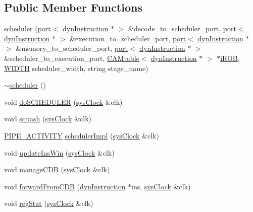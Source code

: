 \subsection*{Public Member Functions}
\begin{DoxyCompactItemize}
\item 
\hyperlink{classscheduler_af495f5702c947e355eb2c54561ff069d}{scheduler} (\hyperlink{classport}{port}$<$ \hyperlink{classdynInstruction}{dynInstruction} $\ast$ $>$ \&decode\_\-to\_\-scheduler\_\-port, \hyperlink{classport}{port}$<$ \hyperlink{classdynInstruction}{dynInstruction} $\ast$ $>$ \&execution\_\-to\_\-scheduler\_\-port, \hyperlink{classport}{port}$<$ \hyperlink{classdynInstruction}{dynInstruction} $\ast$ $>$ \&memory\_\-to\_\-scheduler\_\-port, \hyperlink{classport}{port}$<$ \hyperlink{classdynInstruction}{dynInstruction} $\ast$ $>$ \&scheduler\_\-to\_\-execution\_\-port, \hyperlink{classCAMtable}{CAMtable}$<$ \hyperlink{classdynInstruction}{dynInstruction} $\ast$ $>$ $\ast$\hyperlink{backend_2parser_8cpp_ad73ae25f81e6e99482f3fbd5ba9664ce}{iROB}, \hyperlink{global_2global_8h_a6fa2e24b8a418fa215e183264cbea3aa}{WIDTH} scheduler\_\-width, string stage\_\-name)
\item 
\hyperlink{classscheduler_a4a0e4c12027ab0a23d8aa9e6d9e87ae0}{$\sim$scheduler} ()
\item 
void \hyperlink{classscheduler_a3253fffac337ef94b41e8dcef59dbd74}{doSCHEDULER} (\hyperlink{classsysClock}{sysClock} \&clk)
\item 
void \hyperlink{classscheduler_aa2248008ac06d971f08807593b9a09c2}{squash} (\hyperlink{classsysClock}{sysClock} \&clk)
\item 
\hyperlink{unit_2stage_8h_ab00e4188e8b8974fecb1dfd12764cbb1}{PIPE\_\-ACTIVITY} \hyperlink{classscheduler_a22fd96ca05e81346965e87c0e46b9cca}{schedulerImpl} (\hyperlink{classsysClock}{sysClock} \&clk)
\item 
void \hyperlink{classscheduler_a16ab416645e159625f83cf53bfa408cc}{updateInsWin} (\hyperlink{classsysClock}{sysClock} \&clk)
\item 
void \hyperlink{classscheduler_ad2cdc34a3fc36cf56755e73842a47d49}{manageCDB} (\hyperlink{classsysClock}{sysClock} \&clk)
\item 
void \hyperlink{classscheduler_a50c4d8d6c754c342adbd0750eacd7a64}{forwardFromCDB} (\hyperlink{classdynInstruction}{dynInstruction} $\ast$ins, \hyperlink{classsysClock}{sysClock} \&clk)
\item 
void \hyperlink{classscheduler_ab1cdff1168591f0166016829d460928a}{regStat} (\hyperlink{classsysClock}{sysClock} \&clk)
\end{DoxyCompactItemize}


